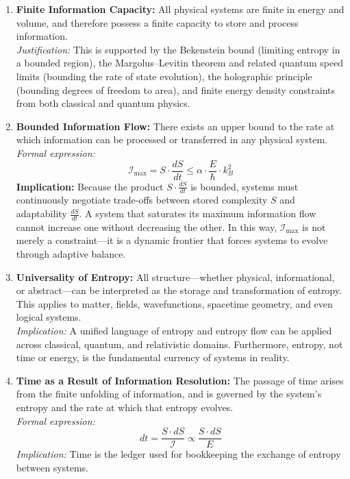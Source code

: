 \documentclass[12pt]{article}
\begin{document}
\begin{enumerate}
    \item \textbf{Finite Information Capacity:}  
    All physical systems are finite in energy and volume, and therefore possess a finite capacity to store and process information.\\
    \textit{Justification:} This is supported by the Bekenstein bound (limiting entropy in a bounded region), the Margolus–Levitin theorem and related quantum speed limits (bounding the rate of state evolution), the holographic principle (bounding degrees of freedom to area), and finite energy density constraints from both classical and quantum physics.

    \item \textbf{Bounded Information Flow:}  
    There exists an upper bound to the rate at which information can be processed or transferred in any physical system.\\
    \textit{Formal expression:}
    \[
    \mathcal{I}_{\text{max}} = S \cdot \frac{dS}{dt} \leq \alpha \cdot \frac{E}{\hbar} \cdot k_B^2
    \]
    \textbf{Implication:} Because the product 
    \( S \cdot \frac{dS}{dt} \) is bounded, systems must continuously negotiate trade-offs between stored complexity 
    \( S \) and adaptability \( \frac{dS}{dt} \). A system that saturates its maximum information flow cannot increase one without decreasing the other. In this way, \( \mathcal{I}_{\text{max}} \) is not merely a constraint—it is a dynamic frontier that forces systems to evolve through adaptive balance.

    \item \textbf{Universality of Entropy:}  
    All structure—whether physical, informational, or abstract—can be interpreted as the storage and transformation of entropy. This applies to matter, fields, wavefunctions, spacetime geometry, and even logical systems.\\
    \textit{Implication:} A unified language of entropy and entropy flow can be applied across classical, quantum, and relativistic domains. Furthermore, entropy, not time or energy, is the fundamental currency of systems in reality.

    \item \textbf{Time as a Result of Information Resolution:}  
    The passage of time arises from the finite unfolding of information, and is governed by the system’s entropy and the rate at which that entropy evolves.\\
    \textit{Formal expression:}
    \[
    dt = \frac{S \cdot dS}{\mathcal{I}} \propto \frac{S \cdot dS}{E}
    \]
    \textit{Implication:} Time is the ledger used for bookkeeping the exchange of entropy between systems.

\end{enumerate}
\end{document}
